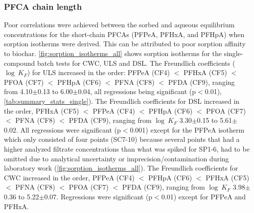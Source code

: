 \subsubsection{PFCA chain length}
Poor correlations were achieved between the sorbed and aqueous equilibrium concentrations for the short-chain PFCAs (PFPeA, PFHxA, and PFHpA) when sorption isotherms were derived. This can be attributed to poor sorption affinity to biochar.
\cref{fig:sorption_isotherms_all} shows sorption isotherms for the single-compound batch tests for CWC, ULS and DSL. The Freundlich coefficients ($\log~K_F$) for ULS increased in the order: PFPeA (CF4) $<$ PFHxA (CF5) $<$ PFOA (CF7) $<$ PFHpA (CF6) $<$ PFNA (CF8) $<$ PFDA (CF9), ranging from 4.10$\pm$0.13 to 6.00$\pm$0.04, all regressions being significant (p$<$0.01), \cref{tab:summary_stats_single}). The Freundlich coefficients for DSL increased in the order, PFHxA (CF5) $<$ PFPeA (CF4) $<$ PFHpA (CF6) $<$ PFOA (CF7) $<$ PFNA (CF8) $<$ PFDA (CF9), ranging from $\log~K_F$ 3.30$\pm$0.15 to 5.61$\pm$0.02. All regressions were significant (p$<$0.001) except for the PFPeA isotherm which only consisted of four points (SC7-10) because several points that had a higher analyzed filtrate concentrations than what was spiked for SP1-6, had to be omitted due to analytical uncertainty or imprecision/contamination during laboratory work (\cref{fig:sorption_isotherms_all}). The Freundlich coefficients for CWC increased in the order, PFPeA (CF4) $<$ PFHpA (CF6) $<$ PFHxA (CF5) $<$ PFNA (CF8) $<$ PFOA (CF7) $<$ PFDA (CF9), ranging from $\log~K_F$ 3.98$\pm$0.36 to 5.22$\pm$0.07. Regressions were significant (p$<$0.01) except for PFPeA and PFHxA. 

